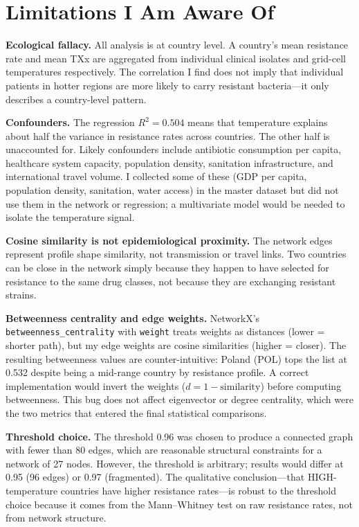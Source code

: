 \documentclass[12pt,a4paper]{article}
\begin{document}
\section{Limitations I Am Aware Of}

\textbf{Ecological fallacy.}
All analysis is at country level.
A country's mean resistance rate and mean TXx are aggregated from
individual clinical isolates and grid-cell temperatures respectively.
The correlation I find does not imply that individual patients in hotter
regions are more likely to carry resistant bacteria---it only describes
a country-level pattern.

\textbf{Confounders.}
The regression $R^2 = 0.504$ means that temperature explains about half
the variance in resistance rates across countries.
The other half is unaccounted for.
Likely confounders include antibiotic consumption per capita, healthcare
system capacity, population density, sanitation infrastructure, and
international travel volume.
I collected some of these (GDP per capita, population density,
sanitation, water access) in the master dataset but did not use them
in the network or regression; a multivariate model would be needed to
isolate the temperature signal.

\textbf{Cosine similarity is not epidemiological proximity.}
The network edges represent profile shape similarity, not
transmission or travel links.
Two countries can be close in the network simply because they happen
to have selected for resistance to the same drug classes, not because
they are exchanging resistant strains.

\textbf{Betweenness centrality and edge weights.}
NetworkX's \texttt{betweenness\_centrality} with \texttt{weight} treats
weights as distances (lower = shorter path), but my edge weights are
cosine similarities (higher = closer).
The resulting betweenness values are counter-intuitive: Poland (POL)
tops the list at 0.532 despite being a mid-range country by resistance
profile.
A correct implementation would invert the weights
($d = 1 - \text{similarity}$) before computing betweenness.
This bug does not affect eigenvector or degree centrality, which
were the two metrics that entered the final statistical comparisons.

\textbf{Threshold choice.}
The threshold 0.96 was chosen to produce a connected graph with fewer
than 80 edges, which are reasonable structural constraints for a
network of 27 nodes.
However, the threshold is arbitrary; results would differ at 0.95
(96 edges) or 0.97 (fragmented).
The qualitative conclusion---that HIGH-temperature countries have
higher resistance rates---is robust to the threshold choice because it
comes from the Mann--Whitney test on raw resistance rates, not from
network structure.
\end{document}
